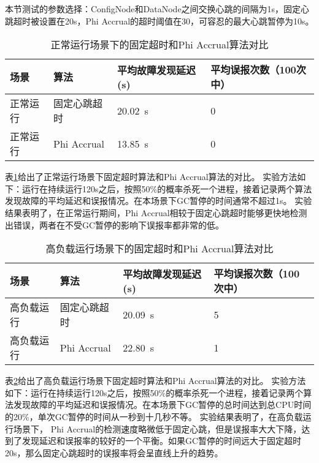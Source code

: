 本节测试的参数选择：ConfigNode和DataNode之间交换心跳的间隔为1s，固定心跳超时被设置在20s，Phi Accrual的超时阈值在30，可容忍的最大心跳暂停为10s。

\begin{table}[h!]
    \centering
    \caption{正常运行场景下的固定超时和Phi Accrual算法对比}
    \label{tab:exp-normal-load}
    \begin{tabular}{@{}llll@{}}
        \toprule
        场景 & 算法 & 平均故障发现延迟 (s) & 平均误报次数（100次中） \\
        \midrule
        正常运行 & 固定心跳超时 & \SI{20.02}{\second} & 0 \\
        正常运行 & Phi Accrual & \SI{13.85}{\second} & 0 \\
        \bottomrule
    \end{tabular}
\end{table}

表\ref{tab:exp-normal-load}给出了正常运行场景下固定超时算法和Phi Accrual算法的对比。
实验方法如下：运行在持续运行120s之后，按照50\%的概率杀死一个进程，接着记录两个算法发现故障的平均延迟和误报情况。在本场景下GC暂停的时间通常不超过1s。
实验结果表明了，在正常运行期间，Phi Accrual相较于固定心跳超时能够更快地检测出错误，两者在不受GC暂停的影响下误报率都非常的低。


\begin{table}[h!]
    \centering
    \caption{高负载运行场景下的固定超时和Phi Accrual算法对比}
    \label{tab:exp-high-load}
    \begin{tabular}{@{}llll@{}}
        \toprule
        场景 & 算法 & 平均故障发现延迟 (s) & 平均误报次数（100次中） \\
        \midrule
        高负载运行 & 固定心跳超时 & \SI{20.09}{\second} & 5 \\
        高负载运行 & Phi Accrual & \SI{22.80}{\second} & 1 \\
        \bottomrule
    \end{tabular}
\end{table}

表\ref{tab:exp-high-load}给出了高负载运行场景下固定超时算法和Phi Accrual算法的对比。
实验方法如下：运行在持续运行120s之后，按照50\%的概率杀死一个进程，接着记录两个算法发现故障的平均延迟和误报情况。在本场景下GC暂停的总时间达到总CPU时间的20\%，单次GC暂停的时间从一秒到十几秒不等。
实验结果表明了，在高负载运行场景下，
Phi Accrual的检测速度略微低于固定心跳，但是误报率大大下降，达到了发现延迟和误报率的较好的一个平衡。如果GC暂停的时间远大于固定超时20s，那么固定心跳超时的误报率将会呈直线上升的趋势。


